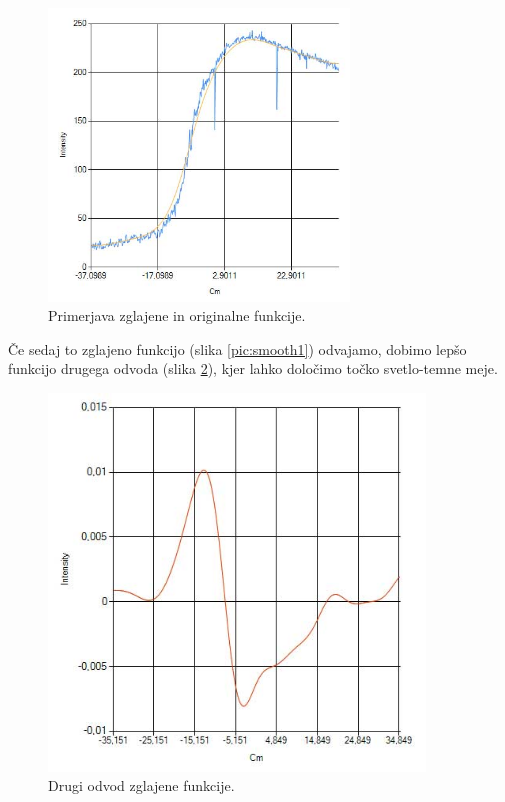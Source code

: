 \documentclass[oneside, a4paper, 12pt]{book}
\begin{document}
\begin{figure}
\begin{center}
\includegraphics[width=8cm]{slike/glajena-+-original.jpg}
\end{center}
\caption{Primerjava zglajene in originalne funkcije.}
\label{pic:smooth2}
\end{figure}

Če sedaj to zglajeno funkcijo (slika \ref{pic:smooth1}) odvajamo, dobimo lepšo funkcijo drugega odvoda (slika \ref{pic:d22}), kjer lahko določimo točko svetlo-temne meje.

\begin{figure}
\begin{center}
\includegraphics[width=10cm]{slike/drugi-odvod-2.jpg}
\end{center}
\caption{Drugi odvod zglajene funkcije.}
\label{pic:d22}
\end{figure}
\end{document}
